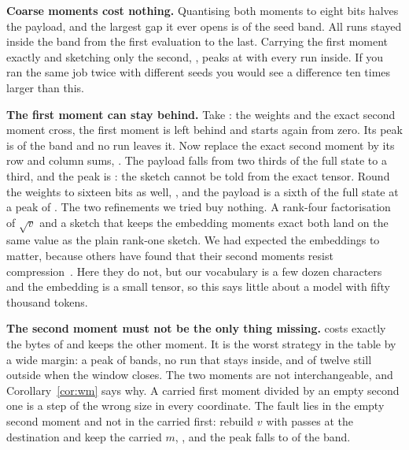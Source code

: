 \textbf{Coarse moments cost nothing.} Quantising both moments to eight bits halves the payload, and the largest gap
it ever opens is \ratioWMqeightVlogeight{} of the seed band. All \inbandWMqeightVlogeight{} runs stayed inside the
band from the first evaluation to the last. Carrying the first moment exactly and sketching only the second,
, peaks at \ratioWMVrone{} with every run inside. If you ran the same job twice with different seeds you would see a
difference ten times larger than this.

\textbf{The first moment can stay behind.} Take : the weights and the exact second moment cross, the first
moment is left behind and starts again from zero. Its peak is \ratioWV{} of the band and no run leaves it. Now
replace the exact second moment by its row and column sums, . The payload falls from two thirds of the
full state to a third, and the peak is \ratioWVrone{}: the sketch cannot be told from the exact tensor. Round the
weights to sixteen bits as well, , and the payload is a sixth of the full state at a peak of
\ratioWbfsixteenVrone. The two refinements we tried buy nothing. A rank-four factorisation of $\sqrt{v}$ and a sketch
that keeps the embedding moments exact both land on the same value as the plain rank-one sketch. We had expected the
embeddings to matter, because others have found that their second moments resist
compression~\cite{kalra2025slimadam}. Here they do not, but our vocabulary is a few dozen characters and the embedding
is a small tensor, so this says little about a model with fifty thousand tokens.

\textbf{The second moment must not be the only thing missing.}  costs exactly the bytes of  and
keeps the other moment. It is the worst strategy in the table by a wide margin: a peak of \ratioWM{} bands, no run
that stays inside, and \censWM{} of twelve still outside when the window closes. The two moments are not
interchangeable, and Corollary~\ref{cor:wm} says why. A carried first moment divided by an empty second one is a step
of the wrong size in every coordinate. The fault lies in the empty second moment and not in the carried first: rebuild
$v$ with \warmPasses{} passes at the destination and keep the carried $m$, , and the peak falls to
\ratioWMWarm{} of the band.

